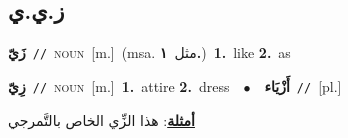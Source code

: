 \documentclass[10pt,a4paper,twoside]{article} %
\begin{document}
\begin{multicols}{2}
\vspace{-3mm}
\subsection*{\color{blue}\foreignlanguage{arabic}{ز.ي.ي}\color{blue}{}} 

{\setlength\topsep{0pt}\textbf{\foreignlanguage{arabic}{زَيّ}}\ {\color{gray}\texttt{//}\color{black}}\ \textsc{noun}\ [m.]\ \color{gray}(msa. \foreignlanguage{arabic}{مثل}~\foreignlanguage{arabic}{\textbf{١.}})\color{black}\ \textbf{1.}~like  \textbf{2.}~as\ } \vspace{2mm}

{\setlength\topsep{0pt}\textbf{\foreignlanguage{arabic}{زِيّ}}\ {\color{gray}\texttt{//}\color{black}}\ \textsc{noun}\ [m.]\ \textbf{1.}~attire  \textbf{2.}~dress\ \ $\bullet$\ \ \setlength\topsep{0pt}\textbf{\foreignlanguage{arabic}{أَزْيَاء}}\ {\color{gray}\texttt{//}\color{black}}\ [pl.]\  \begin{flushright}\color{gray}\foreignlanguage{arabic}{\textbf{\underline{\foreignlanguage{arabic}{أمثلة}}}: هذا الزِّي الخاص بالتَّمرجي}\end{flushright}\color{black}} \vspace{2mm}

\end{multicols}
\end{document}
